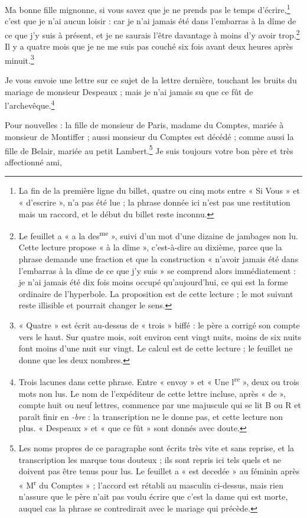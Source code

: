 \documentclass[11pt,a4paper]{article}
\begin{document}
Ma bonne fille mignonne, si vous savez que je ne prends pas le temps
d'écrire,\footnote{La fin de la première ligne du billet, quatre ou cinq mots
entre « Si Vous » et « d'escrire », n'a pas été lue ; la phrase donnée ici
n'est pas une restitution mais un raccord, et le début du billet reste
inconnu.} c'est que je n'ai aucun loisir : car je n'ai jamais été dans
l'embarras à la dîme de ce que j'y suis à présent, et je ne saurais l'être
davantage à moins d'y avoir trop.\footnote{Le feuillet a « a la
des\textsuperscript{me} », suivi d'un mot d'une dizaine de jambages non lu.
Cette lecture propose « à la dîme », c'est-à-dire au dixième, parce que la
phrase demande une fraction et que la construction « n'avoir jamais été dans
l'embarras à la dîme de ce que j'y suis » se comprend alors immédiatement : je
n'ai jamais été dix fois moins occupé qu'aujourd'hui, ce qui est la forme
ordinaire de l'hyperbole. La proposition est de cette lecture ; le mot suivant
reste illisible et pourrait changer le sens.} Il y a quatre mois que je ne me
suis pas couché six fois avant deux heures après
minuit.\footnote{« Quatre » est écrit au-dessus de « trois » biffé : le père a
corrigé son compte vers le haut. Sur quatre mois, soit environ cent vingt
nuits, moins de six nuits font moins d'une nuit sur vingt. Le calcul est de
cette lecture ; le feuillet ne donne que les deux nombres.}

Je vous envoie une lettre sur ce sujet de la lettre dernière, touchant les
bruits du mariage de monsieur Despeaux ; mais je n'ai jamais su que ce fût de
l'archevêque.\footnote{Trois lacunes dans cette phrase. Entre « envoy » et
« Une l\textsuperscript{re} », deux ou trois mots non lus. Le nom de
l'expéditeur de cette lettre incluse, après « de », compte huit ou neuf
lettres, commence par une majuscule qui se lit B ou R et paraît finir en
\emph{-bre} : la transcription ne le donne pas, et cette lecture non plus.
« Despeaux » et « que ce fût » sont donnés avec doute.}

Pour nouvelles : la fille de monsieur de Paris, madame du Comptes, mariée à
monsieur de Montiffer ; aussi monsieur du Comptes est décédé ; comme aussi la
fille de Belair, mariée au petit Lambert.\footnote{Les noms propres de ce
paragraphe sont écrits très vite et sans reprise, et la transcription les
marque tous douteux ; ils sont repris ici tels quels et ne doivent pas être
tenus pour lus. Le feuillet a « est decedée » au féminin après
« M\textsuperscript{r} du Comptes » ; l'accord est rétabli au masculin
ci-dessus, mais rien n'assure que le père n'ait pas voulu écrire que c'est la
dame qui est morte, auquel cas la phrase se contredirait avec le mariage qui
précède.} Je suis toujours votre bon père et très affectionné ami,
\end{document}
